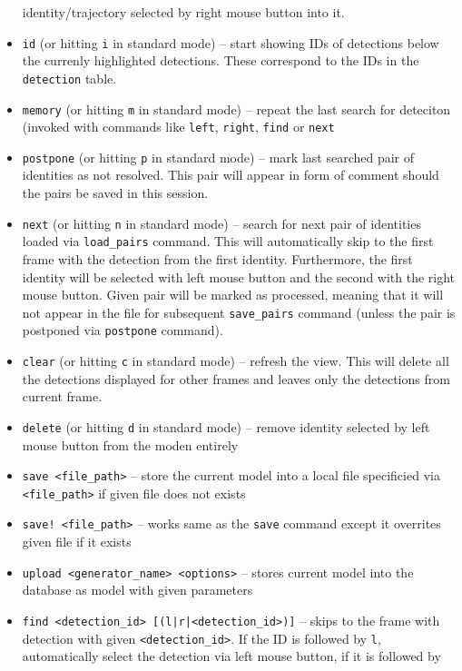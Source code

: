 \begin{itemize}
    identity/trajectory selected by right mouse button into it.
    \item \verb+id+ (or hitting \verb+i+ in standard mode) -- start showing IDs of
    detections below the currenly highlighted detections. These correspond to the IDs
    in the \texttt{detection} table.
    \item \verb+memory+ (or hitting \verb+m+ in standard mode) -- repeat the last search 
    for deteciton (invoked with commands
    like \verb+left+, \verb+right+, \verb+find+ or \verb+next+
    \item \verb+postpone+ (or hitting \verb+p+ in standard mode) -- mark last searched 
    pair of identities as not resolved. This pair will appear in form of comment should
    the pairs be saved in this session.
    \item \verb+next+ (or hitting \verb+n+ in standard mode) -- search for next pair
    of identities loaded via \verb+load_pairs+ command. This will automatically skip
    to the first frame with the detection from the first identity. Furthermore, the
    first identity will be selected with left mouse button and the second with the
    right mouse button. Given pair will be marked as processed, meaning that it will
    not appear in the file for subsequent \verb+save_pairs+ command (unless the pair
    is postponed via \verb+postpone+ command).
    \item \verb+clear+ (or hitting \verb+c+ in standard mode) -- refresh the view.
    This will delete all the detections displayed for other frames and leaves only
    the detections from current frame.
    \item \verb+delete+ (or hitting \verb+d+ in standard mode) -- remove identity
    selected by left mouse button from the moden entirely
    \item \verb+save <file_path>+ -- store the current model into a local file
    specificied via \verb+<file_path>+ if given file does not exists
    \item \verb+save! <file_path>+ -- works same as the \verb+save+ command except
    it overrites given file if it exists
    \item \verb+upload <generator_name> <options>+ -- stores current model into the
    database as model with given parameters
    \item \verb+find <detection_id> [(l|r|<detection_id>)]+ -- skips to the frame
    with detection with given \verb+<detection_id>+. If the ID is followed by \verb+l+,
    automatically select the detection via left mouse button, if it is followed by

\end{itemize}
